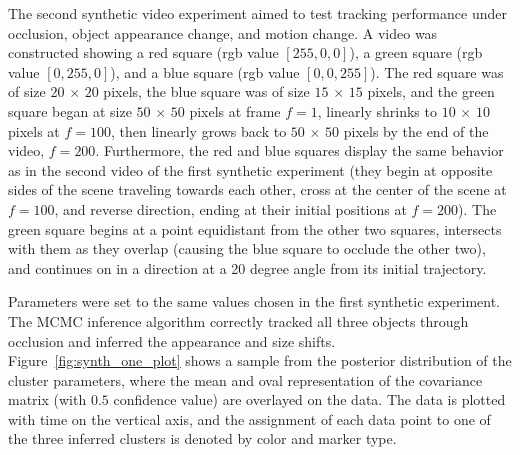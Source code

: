 \documentclass[twocolumn, final]{svjour3}
\begin{document}
The second synthetic video experiment aimed to test tracking performance under occlusion, object appearance change, and motion change. A video was constructed showing a red square (rgb value $[255,0,0]$), a green square (rgb value $[0,255,0]$), and a blue square (rgb value $[0,0,255]$). The red square was of size $20$ $\times$ $20$ pixels, the blue square was of size $15$ $\times$ $15$ pixels, and the green square began at size $50$ $\times$ $50$ pixels at frame $f=1$, linearly shrinks to $10$ $\times$ $10$ pixels at $f=100$, then linearly grows back to $50$ $\times$ $50$ pixels by the end of the video, $f=200$. Furthermore, the red and blue squares display the same behavior as in the second video of the first synthetic experiment (they begin at opposite sides of the scene traveling towards each other, cross at the center of the scene at $f=100$, and reverse direction, ending at their initial positions at $f=200$). The green square begins at a point equidistant from the other two squares, intersects with them as they overlap (causing the blue square to occlude the other two), and continues on in a direction at a 20 degree angle from its initial trajectory.

Parameters were set to the same values chosen in the first synthetic experiment. The MCMC inference algorithm correctly tracked all three objects through occlusion and inferred the appearance and size shifts. Figure~\ref{fig:synth_one_plot} shows a sample from the posterior distribution of the cluster parameters, where the mean and oval representation of the covariance matrix (with $0.5$ confidence value) are overlayed on the data. The data is plotted with time on the vertical axis, and the assignment of each data point to one of the three inferred clusters is denoted by color and marker type. 
\end{document}
